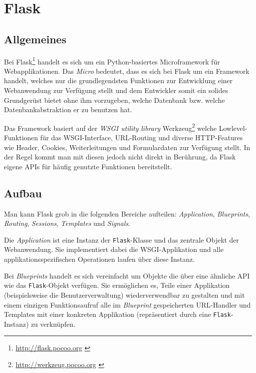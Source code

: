 \chapter{Flask}
\section{Allgemeines}

Bei Flask\footnote{\href{http://flask.pocoo.org}{http://flask.pocoo.org} \citep{flask}} handelt es sich um ein
Python-basiertes Microframework für Webapplikationen. Das \emph{Micro} bedeutet, dass es sich bei
Flask um ein Framework handelt, welches nur die grundlegendsten Funktionen zur Entwicklung einer
Webanwendung zur Verfügung stellt und dem Entwickler somit ein solides Grundgerüst bietet ohne ihm
vorzugeben, welche Datenbank bzw. welche Datenbankabstraktion er zu benutzen hat.

Das Framework basiert auf der \emph{WSGI utility library}
Werkzeug\footnote{\href{http://werkzeug.pocoo.org}{http://werkzeug.pocoo.org} \citep{werkzeug}} welche
Lowlevel-Funktionen für das WSGI-Interface, URL-Routing und diverse HTTP-Features wie Header,
Cookies, Weiterleitungen und Formulardaten zur Verfügung stellt. In der Regel kommt man mit diesen
jedoch nicht direkt in Berührung, da Flask eigene APIs für häufig genutzte Funktionen bereitstellt.

\section{Aufbau}

Man kann Flask grob in die folgenden Bereiche aufteilen: \emph{Application}, \emph{Blueprints},
\emph{Routing}, \emph{Sessions}, \emph{Templates} und \emph{Signals}.

Die \emph{Application} ist eine Instanz der \lstinline{Flask}-Klasse und das zentrale Objekt der
Webanwendung. Sie implementiert dabei die WSGI-Applikation und alle applikationsspezifischen
Operationen laufen über diese Instanz.

Bei \emph{Blueprints} handelt es sich vereinfacht um Objekte die über eine ähnliche API wie das
\lstinline{Flask}-Objekt verfügen. Sie ermöglichen es, Teile einer Applikation (beispielsweise die
Benutzerverwaltung) wiederverwendbar zu gestalten und mit einem einzigen Funktionsaufruf alle im
\emph{Blueprint} gespeicherten URL-Handler und Templates mit einer konkreten Applikation
(repräsentiert durch eine \lstinline{Flask}-Instanz) zu verknüpfen.

